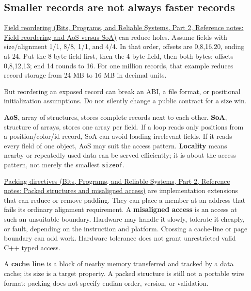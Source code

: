 \subsection{Smaller records are not always faster records}\label{05-engine-i-ch002-smaller-records-are-not-always-faster-records}

\hypertarget{05-engine-i-ch002-smaller-records-are-not-always-faster-records}{}

\href{../01-Bits-Programs-and-Reliable-Systems-P02/main.pdf\#nameddest=appendix-5522ad176ca0}{Field reordering (Bits, Programs, and Reliable Systems, Part 2, Reference notes: Field reordering and AoS versus SoA)} can reduce holes. Assume fields with size/alignment 1/1, 8/8, 1/1, and 4/4. In that order, offsets are 0,8,16,20, ending at 24. Put the 8-byte field first, then the 4-byte field, then both bytes: offsets 0,8,12,13; end 14 rounds to 16. For one million records, that example reduces record storage from 24 MB to 16 MB in decimal units.

But reordering an exposed record can break an ABI, a file format, or positional initialization assumptions. Do not silently change a public contract for a size win.

\textbf{AoS}, array of structures, stores complete records next to each other. \textbf{SoA}, structure of arrays, stores one array per field. If a loop reads only positions from a position/color/id record, SoA can avoid loading irrelevant fields. If it reads every field of one object, AoS may suit the access pattern. \textbf{Locality} means nearby or repeatedly used data can be served efficiently; it is about the access pattern, not merely the smallest \texttt{sizeof}.

\href{../01-Bits-Programs-and-Reliable-Systems-P02/main.pdf\#nameddest=appendix-0682dbfc5f0e}{Packing directives (Bits, Programs, and Reliable Systems, Part 2, Reference notes: Packed structures and misaligned access)} are implementation extensions that can reduce or remove padding. They can place a member at an address that fails its ordinary alignment requirement. A \textbf{misaligned access} is an access at such an unsuitable boundary. Hardware may handle it slowly, tolerate it cheaply, or fault, depending on the instruction and platform. Crossing a cache-line or page boundary can add work. Hardware tolerance does not grant unrestricted valid C++ typed access.

A \textbf{cache line} is a block of nearby memory transferred and tracked by a data cache; its size is a target property. A packed structure is still not a portable wire format: packing does not specify endian order, version, or validation.

